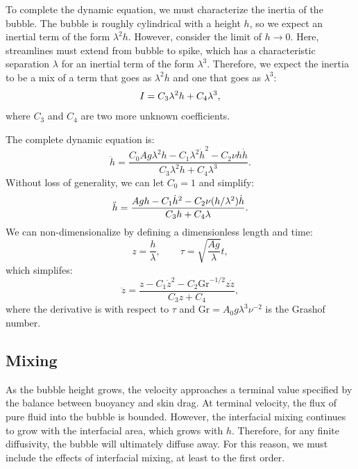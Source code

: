 To complete the dynamic equation, we must characterize the inertia of the bubble.
The bubble is roughly cylindrical with a height $h$, so we expect an inertial term of the form $\lambda^2 h$.
However, consider the limit of $h \rightarrow 0$.  
Here, streamlines must extend from bubble to spike, which has a characteristic separation $\lambda$ for an inertial term of the form $\lambda^3$.
Therefore, we expect the inertia to be a mix of a term that goes as $\lambda^2 h$ and one that goes as $\lambda^3$:
\begin{equation} \elabel{inertia}
I = C_3 \lambda^2 h + C_4 \lambda^3,
\end{equation}
where $C_3$ and $C_4$ are two more unknown coefficients.

The complete dynamic equation is:
\begin{equation}
\ddot{h} = \frac{C_0 A g \lambda^2 h - C_1 \lambda^2 \dot{h}^2 - C_2 \nu h \dot{h}}{C_3 \lambda^2 h + C_4 \lambda^3}.
\end{equation}
Without loss of generality, we can let $C_0 = 1$ and simplify:
\begin{equation} \elabel{dynamics}
\ddot{h} = \frac{A g h - C_1 \dot{h}^2 - C_2 \nu (h/\lambda^2) \dot{h}}{ C_3 h + C_4 \lambda }.
\end{equation}
We can non-dimensionalize by defining a dimensionless length and time:
\begin{equation}
z = \frac{h}{\lambda}, \qquad \tau = \sqrt{\frac{A g}{\lambda}} t,
\end{equation}
which simplifes:
\begin{equation}
\ddot{z} = \frac{z - C_1 \dot{z}^2 - C_2 \text{Gr}^{-1/2} z \dot{z}}{C_3 z + C_4},
\end{equation}
where
the derivative is with respect to $\tau$ and 
$\text{Gr} = A_0 g \lambda^3 \nu^{-2}$ is the Grashof number.


\subsection{Mixing}

As the bubble height grows, the velocity approaches a terminal value specified by the balance between buoyancy and skin drag.
At terminal velocity, the flux of pure fluid into the bubble is bounded.
However, the interfacial mixing continues to grow with the interfacial area, which grows with $h$.
Therefore, for any finite diffusivity, the bubble will ultimately diffuse away.
For this reason, we must include the effects of interfacial mixing, at least to the first order.

